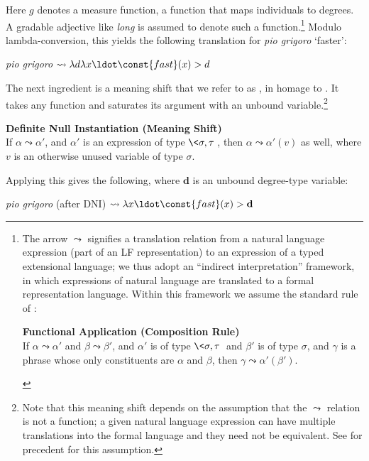 \documentclass[output=paper
,modfonts
,nonflat]{langsci/langscibook}
\begin{document}
Here $g$ denotes a measure function, a function that maps individuals to degrees. A gradable adjective like \textit{long} is assumed to denote such a function.\footnote{The arrow $\leadsto$ signifies a translation relation from a natural language expression (part of an LF representation) to an expression of a typed extensional language; we thus adopt an ``indirect interpretation'' framework, in which expressions of natural language are translated to a formal representation language. Within this framework we assume the standard rule of :

\begin{exe}
	 \textbf{Functional Application (Composition Rule)}\\
	If $\alpha \leadsto \alpha'$  and $\beta \leadsto \beta'$, and $\alpha'$ is of type $\<\sigma,\tau\>$ and $\beta'$ is of type $\sigma$, and $\gamma$ is a phrase whose only constituents are $\alpha$ and $\beta$, then $\gamma \leadsto \alpha'(\beta')$.
\end{exe} 
}
Modulo lambda-conversion, this yields the following translation for \textit{pio grigoro} `faster':

\ea \textit{pio grigoro}  $\leadsto \lambda d \lambda x \ldot \const{fast}(x) > d$\label{longer}
\z 

The next ingredient is a meaning shift that we refer to as , in homage to \citet{Fillmore1986}. It takes any function and saturates its argument with an unbound variable.\footnote{Note that this meaning shift depends on the assumption that the $\leadsto$ relation is not a function; a given natural language expression can have multiple translations into the formal language and they need not be equivalent. See \citet{ParteeRooth1983} for precedent for this assumption.}

\ea \label{ex:coppockstrand:80}
\textbf{Definite Null Instantiation (Meaning Shift)}\\
If $\alpha \leadsto \alpha'$, and $\alpha'$ is an expression of type $\<\sigma,\tau\>$, then $\alpha \leadsto \alpha'(v)$ as well, where $v$ is an otherwise unused variable of type $\sigma$.
\z 

Applying this gives the following, where $\textbf{d}$ is an unbound degree-type variable:

\ea \label{ex:coppockstrand:81}
\textit{pio grigoro}  (after DNI) $\leadsto \lambda x \ldot \const{fast}(x) > \textbf{d}$ 
\z 
\end{document}

